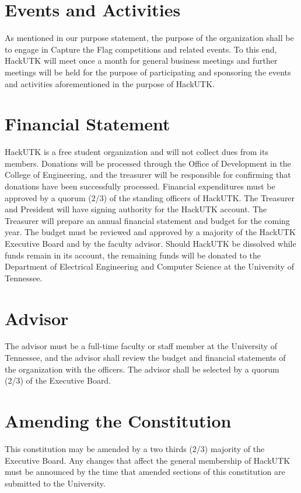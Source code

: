 \documentclass[12pt]{article}
\begin{document}
\section*{Events and Activities}
As mentioned in our purpose statement, the purpose of the organization shall be to engage in Capture the Flag competitions and related events. To this end, HackUTK will meet once a month for general business meetings and further meetings will be held for the purpose of participating and sponsoring the events and activities aforementioned in the purpose of HackUTK.

\section*{Financial Statement}
HackUTK is a free student organization and will not collect dues from its members. Donations will be processed through the Office of Development in the College of Engineering, and the treasurer will be responsible for confirming that donations have been successfully processed. Financial expenditures must be approved by a quorum (2/3) of the standing officers of HackUTK. The Treasurer and President will have signing authority for the HackUTK account. The Treasurer will prepare an annual financial statement and budget for the
coming year. The budget must be reviewed and approved by a majority of the
HackUTK Executive Board and by the faculty advisor. Should HackUTK be dissolved while funds remain in its account, the remaining funds will be donated to the Department of Electrical Engineering and Computer
Science at the University of Tennessee.

\section*{Advisor}
The advisor must be a full-time faculty or staff member at the University of Tennessee, and the advisor shall review the budget and financial statements of the organization with the officers. The advisor shall be selected by a quorum (2/3) of the Executive Board.

\section*{Amending the Constitution}
This constitution may be amended by a two thirds (2/3) majority of the Executive
Board. Any changes that affect the general membership of HackUTK must be
announced by the time that amended sections of this constitution are submitted to the University.
\end{document}
